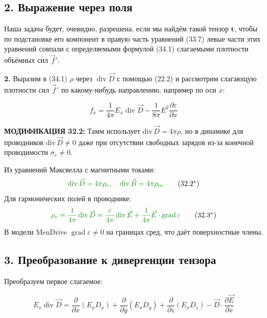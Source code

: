 \documentclass[a4paper,12pt]{article}
\newcommand{\modtext}[1]{\textcolor{modcolor}{#1}}
\newcommand{\modmath}[1]{\textcolor{modcolor}{#1}}
\newcommand{\modblock}[1]{\colorbox{modcolor!10}{\parbox{\dimexpr\linewidth-2\fboxsep}{#1}}}
\begin{document}
\subsection*{2. Выражение через поля}

\noindent
Наша задача будет, очевидно, разрешена, если мы найдём такой тензор
$\mathbf{t}$, чтобы по подстановке его компонент в правую часть
уравнений (33.7) левые части этих уравнений совпали с определяемыми
формулой (34.1) слагаемыми плотности объёмных сил $\vec{f}'$.

\textbf{2.} Выразим в (34.1) $\rho$ через $\operatorname{div}\vec{D}$
с помощью (22.2) и рассмотрим слагающую плотности сил $\vec{f}'$
по какому-нибудь направлению, например по оси $x$:

\begin{equation}
f_x = \frac{1}{4\pi}E_x\operatorname{div}\vec{D} -
\frac{1}{8\pi}E^2\frac{\partial\varepsilon}{\partial x}
\tag{32.2}
\end{equation}

\modtext{
\textbf{МОДИФИКАЦИЯ 32.2:} Тамм использует $\text{div}\,\vec{D} = 4\pi\rho$,
но в динамике для проводников $\text{div}\,\vec{D} \neq 0$ даже при
отсутствии свободных зарядов из-за конечной проводимости $\sigma_e \neq 0$.
}

\modblock{
\modtext{
Из уравнений Максвелла с магнитными токами:
\begin{equation}
\modmath{
\operatorname{div}\vec{D} = 4\pi\rho_e, \quad
\operatorname{div}\vec{B} = 4\pi\rho_m
}
\tag{32.2$^*$}
\end{equation}
Для гармонических полей в проводнике:
\begin{equation}
\modmath{
\rho_e = \frac{1}{4\pi}\operatorname{div}\vec{D} =
\frac{\varepsilon}{4\pi}\operatorname{div}\vec{E} +
\frac{1}{4\pi}\vec{E}\cdot\operatorname{grad}\varepsilon
}
\tag{32.3$^*$}
\end{equation}
В модели MenDrive $\operatorname{grad}\varepsilon \neq 0$ на границах
сред, что даёт поверхностные члены.
}
}

\subsection*{3. Преобразование к дивергенции тензора}

\noindent
Преобразуем первое слагаемое:

\begin{equation}
E_x\operatorname{div}\vec{D} =
\frac{\partial}{\partial x}(E_x D_x) +
\frac{\partial}{\partial y}(E_x D_y) +
\frac{\partial}{\partial z}(E_x D_z) -
\vec{D}\cdot\frac{\partial\vec{E}}{\partial x}
\tag{32.4}
\end{equation}
\end{document}
